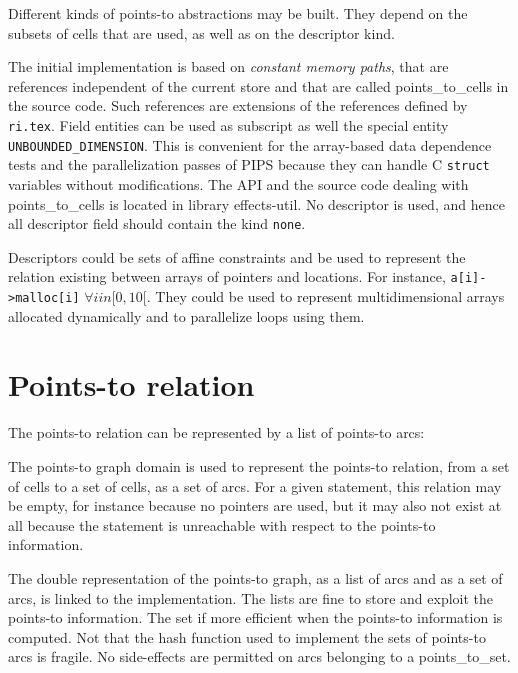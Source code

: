 \documentclass{article}
\begin{document}
Different kinds of points-to abstractions may be built. They depend on
the subsets of cells that are used, as well as on the descriptor
kind.

The initial implementation is based on {\em constant memory paths},
that are references independent of the current store and that are
called points\_to\_cells in the source code. Such references are
extensions of the references defined by \verb/ri.tex/. Field entities
can be used as subscript as well the special entity
\verb/UNBOUNDED_DIMENSION/. This is convenient for the array-based data
dependence tests and the parallelization passes of PIPS because they
can handle C \verb/struct/ variables without modifications. The API
and the source code dealing with points\_to\_cells is located in
library effects-util. No descriptor is used, and hence all descriptor
field should contain the kind \verb/none/.

Descriptors could be sets of affine constraints and be used to
represent the relation existing between arrays of pointers and
locations. For instance, \verb/a[i]->malloc[i]/ $\forall i in
[0,10[$. They could be used to represent multidimensional arrays
    allocated dynamically and to parallelize loops using them.


\section{Points-to relation}

The points-to relation can be represented by a list of points-to arcs:

{}

The points-to graph domain is used to represent the points-to
relation, from a set of cells to a set of cells, as a set of arcs. For
a given statement, this relation may be empty, for instance because no
pointers are used, but it may also not exist at all because the
statement is unreachable with respect to the points-to information.

{}

The double representation of the points-to graph, as a list of arcs
and as a set of arcs, is linked to the implementation. The lists are
fine to store and exploit the points-to information. The set if more
efficient when the points-to information is computed. Not that the
hash function used to implement the sets of points-to arcs is
fragile. No side-effects are permitted on arcs belonging to a
points\_to\_set.
\end{document}
